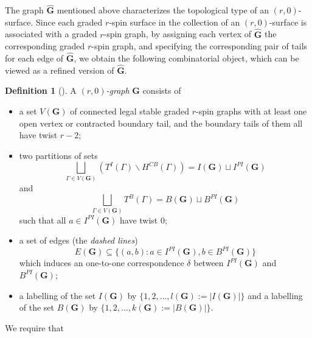 \documentclass[11pt]{amsart}
\theoremstyle{definition}
\newtheorem{dfn}[dummy]{Definition}
\theoremstyle{remark}
\newcommand{\<}{\left<}
\renewcommand{\>}{\right>}
\numberwithin{equation}{section}
\begin{document}
The graph $\hat{\mathbf{G}}$ mentioned above characterizes the topological type of an $(r,0)$-surface. Since each graded $r$-spin surface in the collection of an $(r,0)$-surface is associated with a graded $r$-spin graph, by assigning each vertex of $\hat{\mathbf{G}}$ the corresponding graded $r$-spin graph, and specifying the corresponding pair of tails for each edge of $\hat{\mathbf{G}}$, we obtain the following combinatorial object, which can be viewed as a refined version of $\hat{\mathbf{G}}$.
\begin{dfn}[{\cite[Definition 4.7]{TZ1}}]\label{def rh graphs}
A \textit{$(r,0)$-graph}  $\mathbf{G}$ consists of 
\begin{itemize} 
    \item a set $V(\mathbf{G})$ of connected legal stable graded $r$-spin graphs with at least one open vertex or contracted boundary tail, and the boundary tails of them all have twist %
$r-2$;
    \item two %
partitions of sets
    $$
    \bigsqcup_{\Gamma\in V(\mathbf{G})}\left(T^I(\Gamma)\backslash H^{CB}(\Gamma)\right)=I(\mathbf{G})\sqcup I^{PI}(\mathbf{G})
    $$
    and
    $$
    \bigsqcup_{\Gamma\in V(\mathbf{G})}T^B(\Gamma)=B(\mathbf{G})\sqcup B^{PI}(\mathbf{G})
    $$
    such that all $a\in I^{PI}(\bm{G})$ have twist $0$;
    \item a set of edges (the \textit{dashed lines}) $$E(\mathbf{G})\subseteq \{(a,b)\colon a\in I^{PI}(\mathbf{G}),b\in B^{PI}(\mathbf{G})\}$$ which induces an one-to-one correspondence $\delta$ between $I^{PI}(\mathbf{G})$ and $B^{PI}(\mathbf{G})$;
    \item a labelling of the set $I(\mathbf{G})$ by $\{1,2,\dots,l(\mathbf{G}):=\lvert I(\mathbf{G})\rvert\}$ and a labelling of the set $B(\mathbf{G})$ by $\{1,2,\dots,k(\mathbf{G}):=\lvert B(\mathbf{G})\rvert\}$.
\end{itemize}
    We require that 
\end{dfn}
\end{document}
